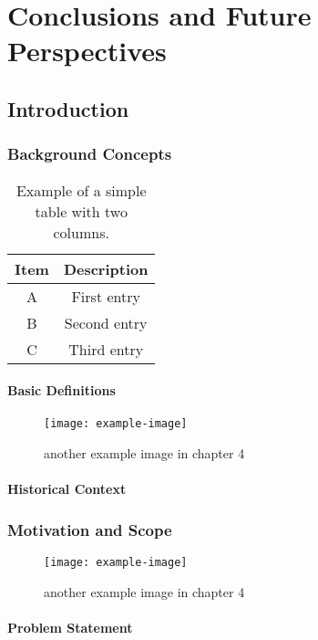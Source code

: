 \chapter{Conclusions and Future Perspectives} \label{CH4}
\section{Introduction }
\lipsum[1-3]
\subsection{Background Concepts}
\lipsum[1]
\begin{table}[h!]
	\centering
	\caption{Example of a simple table with two columns.}
	\small
	\begin{tabular}{|c|c|}
		\hline
		\textbf{Item} & \textbf{Description} \\ \hline
		A & First entry \\ \hline
		B & Second entry \\ \hline
		C & Third entry \\ \hline
	\end{tabular}
	\label{tab:simple}
\end{table}
\subsubsection{Basic Definitions}

		\begin{figure}[h!]
			\centering
			\texttt{[image: example-image]}
			\caption{another example image in chapter 4}
			\label{fig4.1:just-ecample}
			
		\end{figure}
\subsubsection{Historical Context}


\subsection{Motivation and Scope}

		\begin{figure}[h!]
	\centering
	\texttt{[image: example-image]}
	\caption{another example image in chapter 4}
	\label{fig4.2:just-ecample}
	
\end{figure}
\subsubsection{Problem Statement}
